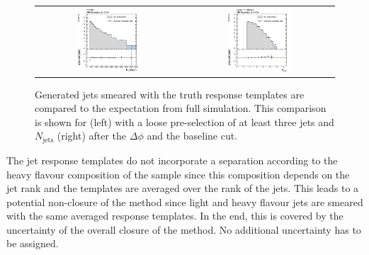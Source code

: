 \begin{description}
\begin{figure}[hbtp]
  \centering
  \begin{tabular}{cc}
                \includegraphics[width=0.47\textwidth]{figures/HT_presel_madgraph_DR53X_chs_TuneZ2star_SmearedGenJets_withoutPUReweighting_v1.png} &
                \includegraphics[width=0.47\textwidth]{figures/NJets_baseline_withoutMHT_madgraph_DR53X_chs_TuneZ2star_SmearedGenJets_withoutPUReweighting_v1.png} 
  \end{tabular}
  \caption{Generated jets smeared with the truth response templates are compared to the expectation from full simulation. This comparison is shown for \HT (left) with a loose pre-selection of at least three jets and $N_{\text{jets}}$ (right) after the $\Delta \phi$ and the baseline \HT cut.}
  \label{fig:qcd_rs_genjets}
\end{figure}

The jet response templates do not incorporate a separation according to the heavy flavour composition of the sample since this composition depends on the jet rank and the templates are averaged over the rank of the jets. This leads to a potential non-closure of the method since light and heavy flavour jets are smeared with the same averaged response templates. In the end, this is covered by the uncertainty of the overall closure of the method. No additional uncertainty has to be assigned.
\end{description}

